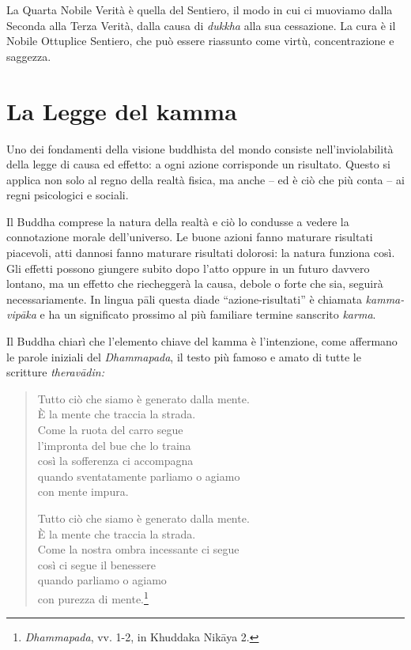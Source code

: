 La Quarta Nobile Verità è quella del Sentiero, il modo in cui ci
muoviamo dalla Seconda alla Terza Verità, dalla causa di \emph{dukkha}
alla sua cessazione. La cura è il Nobile Ottuplice Sentiero, che può
essere riassunto come virtù, concentrazione e saggezza.

\section{La Legge del kamma}

Uno dei fondamenti della visione buddhista del mondo consiste
nell'inviolabilità della legge di causa ed effetto: a ogni azione
corrisponde un risultato. Questo si applica non solo al regno della
realtà fisica, ma anche -- ed è ciò che più conta -- ai regni
psicologici e sociali.

Il Buddha comprese la natura della realtà e ciò lo condusse a vedere la
connotazione morale dell'universo. Le buone azioni fanno maturare
risultati piacevoli, atti dannosi fanno maturare risultati dolorosi: la
natura funziona così. Gli effetti possono giungere subito dopo l'atto
oppure in un futuro davvero lontano, ma un effetto che riecheggerà la
causa, debole o forte che sia, seguirà necessariamente. In lingua pāli
questa diade ``azione-risultati'' è chiamata \emph{kamma-vipāka} e ha un
significato prossimo al più familiare termine sanscrito \emph{karma}.

Il Buddha chiarì che l'elemento chiave del kamma è l'intenzione,
come affermano le parole iniziali del \emph{Dhammapada}, il testo più
famoso e amato di tutte le scritture \emph{theravādin:}

\begin{quote}

Tutto ciò che siamo è generato dalla mente.\\
È la mente che traccia la strada.\\
Come la ruota del carro segue\\
l'impronta del bue che lo traina\\
così la sofferenza ci accompagna\\
quando sventatamente parliamo o agiamo\\
con mente impura.

Tutto ciò che siamo è generato dalla mente.\\
È la mente che traccia la strada.\\
Come la nostra ombra incessante ci segue\\
così ci segue il benessere\\
quando parliamo o agiamo\\
con purezza di mente.\footnote{\emph{Dhammapada}, vv. 1-2, in
  Khuddaka Nikāya 2.}

\end{quote}

